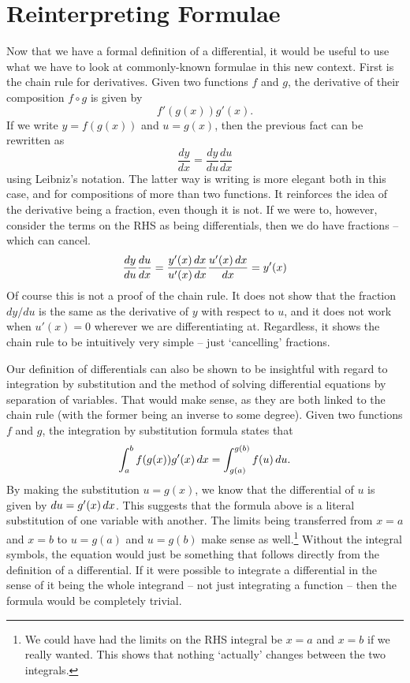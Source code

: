 \documentclass[a4paper,12pt]{article}
\begin{document}
\section{Reinterpreting Formulae}

Now that we have a formal definition of a differential, it would be useful to use what we have to look at commonly-known formulae in this new context.
First is the chain rule for derivatives.
Given two functions $f$ and $g$, the derivative of their composition $f \circ g$ is given by
\begin{equation*}
    f'(g(x)) g'(x).
\end{equation*}
If we write $y = f(g(x))$ and $u = g(x)$, then the previous fact can be rewritten as
\begin{equation*}
    \frac{dy}{dx} = \frac{dy}{du} \frac{du}{dx}
\end{equation*}
using Leibniz's notation.
The latter way is writing is more elegant both in this case, and for compositions of more than two functions.
It reinforces the idea of the derivative being a fraction, even though it is not.
If we were to, however, consider the terms on the RHS as being differentials, then we do have fractions -- which can cancel.
\begin{align*}
    \frac{dy}{du} \frac{du}{dx} = \frac{y'(x) \mathop{}\!d x}{u'(x) \mathop{}\!d x} \frac{u'(x) \mathop{}\!d x}{dx} = y'(x)
\end{align*}
Of course this is not a proof of the chain rule.
It does not show that the fraction $dy/du$ is the same as the derivative of $y$ with respect to $u$, and it does not work when $u'(x) = 0$ wherever we are differentiating at.
Regardless, it shows the chain rule to be intuitively very simple -- just `cancelling' fractions.

Our definition of differentials can also be shown to be insightful with regard to integration by substitution and the method of solving differential equations by separation of variables.
That would make sense, as they are both linked to the chain rule (with the former being an inverse to some degree).
Given two functions $f$ and $g$, the integration by substitution formula states that
\begin{equation*}
    \int_{a}^{b} f(g(x))g'(x) \mathop{}\!d x = \int_{g(a)}^{g(b)} f(u) \mathop{}\!d u.
\end{equation*}
By making the substitution $u = g(x)$, we know that the differential of $u$ is given by $du = g'(x) \mathop{}\!d x$.
This suggests that the formula above is a literal substitution of one variable with another.
The limits being transferred from $x=a$ and $x=b$ to $u=g(a)$ and $u=g(b)$ make sense as well.\footnote{We could have had the limits on the RHS integral be $x=a$ and $x=b$ if we really wanted. This shows that nothing `actually' changes between the two integrals.}
Without the integral symbols, the equation would just be something that follows directly from the definition of a differential.
If it were possible to integrate a differential in the sense of it being the whole integrand -- not just integrating a function -- then the formula would be completely trivial.
\end{document}
